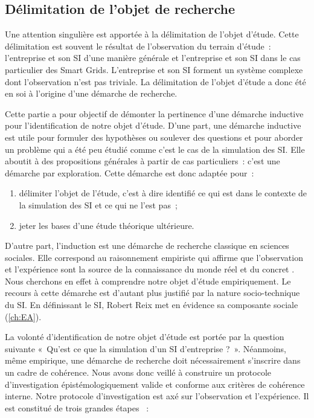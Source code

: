 	\subsection{Délimitation de l'objet de recherche}
		
	Une attention singulière est apportée à la délimitation de l'objet d'étude. 
Cette délimitation est souvent le résultat de l'observation du terrain d'étude~: 
l'entreprise et son SI d'une manière générale et l'entreprise et son SI dans le 
cas particulier des Smart Grids. L'entreprise et son SI forment un système 
complexe dont l'observation n'est pas triviale. La délimitation de l'objet 
d'étude a donc été en soi à l'origine d'une démarche de recherche.
	
	Cette partie a pour objectif de démonter la pertinence d'une démarche inductive 
pour l'identification de notre objet d'étude. D'une part, une démarche inductive 
est utile pour formuler des hypothèses ou soulever des questions et pour aborder 
un problème qui a été peu étudié comme c'est le cas de la simulation des SI. 
Elle aboutit à des propositions générales à partir de cas particuliers~: c'est 
une démarche par exploration. 
	Cette démarche est donc adaptée pour~: 
	\begin{enumerate}
	\item délimiter l'objet de l'étude, c'est à dire identifié ce qui est dans le 
contexte de la simulation des SI et ce qui ne l'est pas~;
	\item jeter les bases d'une étude théorique ultérieure.
	\end{enumerate}
	
	D'autre part, l'induction est une démarche de recherche classique en sciences 
sociales. Elle correspond au raisonnement empiriste qui affirme que 
l'observation et l'expérience sont la source de la connaissance du monde réel et 
du concret \cite{madeleine2001methodes}. Nous cherchons en effet à comprendre 
notre objet d'étude empiriquement. Le recours à cette démarche est d'autant plus 
justifié par la nature socio-technique du SI. En définissant le SI, Robert Reix 
met en évidence sa composante sociale (\ref{ch:EA}). 
	

	La volonté d'identification de notre objet d'étude est portée par la question 
suivante «~Qu'est ce que la simulation d'un SI d'entreprise ?~». Néanmoins, même 
empirique, une démarche de recherche doit nécessairement s'inscrire dans un 
cadre de cohérence. Nous avons donc veillé à construire un protocole 
d'investigation épistémologiquement valide et conforme aux critères de cohérence 
interne. Notre protocole d'investigation est axé sur l'observation et 
l'expérience. Il est constitué de trois grandes étapes ~:
		
